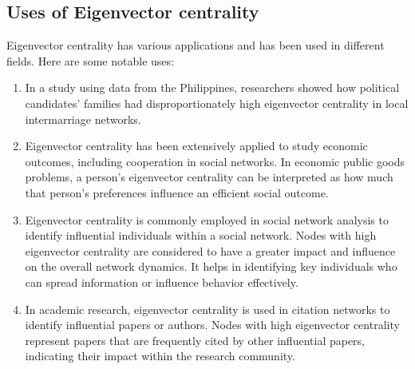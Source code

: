 \documentclass{article}
\begin{document}
    \subsection{Uses of Eigenvector centrality}
    Eigenvector centrality has various applications and has been used in different fields. Here are some notable uses:
    \begin{enumerate}
        \item In a study using data from the Philippines, researchers showed how political candidates' families had disproportionately high eigenvector centrality in local intermarriage networks.
        \item Eigenvector centrality has been extensively applied to study economic outcomes, including cooperation in social networks. In economic public goods problems, a person's eigenvector centrality can be interpreted as how much that person's preferences influence an efficient social outcome.
        \item Eigenvector centrality is commonly employed in social network analysis to identify influential individuals within a social network. Nodes with high eigenvector centrality are considered to have a greater impact and influence on the overall network dynamics. It helps in identifying key individuals who can spread information or influence behavior effectively.
        \item In academic research, eigenvector centrality is used in citation networks to identify influential papers or authors. Nodes with high eigenvector centrality represent papers that are frequently cited by other influential papers, indicating their impact within the research community.
    \end{enumerate}
\end{document}
